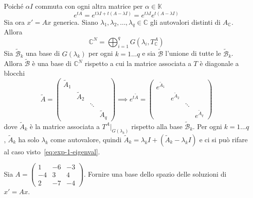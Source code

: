 Poiché \(\alpha I\) commuta con ogni altra matrice per \(\alpha \in \mathbb{K}\) 
\begin{equation}\label{eq:exp-1-eigenval}
    e^{tA} = e^{t \lambda I + t{(A- \lambda I)}} = e^{t\lambda I}e^{t(A-\lambda
    I)}
\end{equation}
Sia ora \(x' = Ax\) generica. Siano \(\lambda_{1}, \lambda_{2}, \dots, \lambda_q
\in \mathbb{C}\) gli autovalori distinti di \(A_{\mathbb{C}} \). Allora
\[
    \mathbb{C}^{N} = \bigoplus_{i=1}^{q} G{(\lambda_{i}, T^A_{\mathbb{C}})}
\]
Sia \(\tilde{\mathcal{B}}_k\) una base di \(G{(\lambda_{k})}\) per ogni \(k =
1\dots q\) e sia \(\tilde{\mathcal{B}}\) l'unione di tutte le
\(\tilde{\mathcal{B}}_k\). Allora \(\tilde{\mathcal{B}}\) è una base di
\(\mathbb{C}^{N}\) rispetto a cui la matrice associata a \(T\) è diagonale a
blocchi
\[
  \tilde{A} = \begin{pmatrix}
      \tilde{A}_{1} &  &  &  \\
       & \tilde{A}_2 &  &  \\
        &  & \ddots &  \\
         &  &  & \tilde{A}_q
  \end{pmatrix} \implies e^{t\tilde{A}} =
  \begin{pmatrix}
      e^{\tilde{A}_{1}} &  &  &  \\
       & e^{\tilde{A}_2} &  &  \\
        &  & \ddots &  \\
         &  &  & e^{\tilde{A}_q}
  \end{pmatrix}
\]
dove \(\tilde{A}_k\) è la matrice associata a \(T^{A}|_{G{(\lambda_{k})}}\) rispetto
alla base \(\tilde{\mathcal{B}}_k\). 
Per ogni \(k = 1\dots q\), \(\tilde{A}_k\) ha solo \(\lambda_{k}\) come
autovalore, quindi \(\tilde{A}_k = \lambda_{k} I + {(\tilde{A}_k - \lambda_{k}
I)}\) e ci si può rifare al caso visto~\eqref{eq:exp-1-eigenval}.

\begin{eser}
    Sia \(A = \begin{pmatrix}
        1 & -6 & -3 \\
        -4 & 3 & 4 \\
        2 & -7 & -4
    \end{pmatrix}\). 
    Fornire una base dello spazio delle soluzioni di \(x' = Ax\).
\end{eser}


